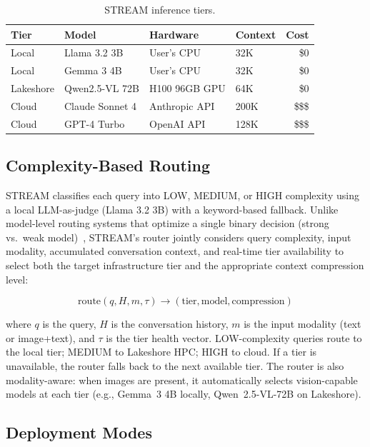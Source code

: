 \documentclass[manuscript, review]{acmart}
\begin{document}
\begin{table}[h]
\centering
\caption{STREAM inference tiers.}
\label{tab:tiers}
\small
\begin{tabular}{@{}llllr@{}}
\toprule
\textbf{Tier} & \textbf{Model} & \textbf{Hardware} & \textbf{Context} & \textbf{Cost} \\
\midrule
Local     & Llama 3.2 3B    & User's CPU     & 32K  & \$0 \\
Local     & Gemma 3 4B      & User's CPU     & 32K  & \$0 \\
Lakeshore & Qwen2.5-VL 72B  & H100 96GB GPU  & 64K  & \$0 \\
Cloud     & Claude Sonnet 4 & Anthropic API  & 200K & \$\$\$ \\
Cloud     & GPT-4 Turbo     & OpenAI API     & 128K & \$\$\$ \\
\bottomrule
\end{tabular}
\end{table}

\subsection{Complexity-Based Routing}

STREAM classifies each query into LOW, MEDIUM, or HIGH complexity using a local LLM-as-judge (Llama 3.2 3B) with a keyword-based fallback. Unlike model-level routing systems that optimize a single binary decision (strong vs.\ weak model)~\cite{routellm2024,hybridllm2024}, STREAM's router jointly considers query complexity, input modality, accumulated conversation context, and real-time tier availability to select both the target infrastructure tier and the appropriate context compression level:

\[
\text{route}(q, H, m, \tau) \rightarrow (\text{tier}, \text{model}, \text{compression})
\]

\noindent where $q$ is the query, $H$ is the conversation history, $m$ is the input modality (text or image+text), and $\tau$ is the tier health vector. LOW-complexity queries route to the local tier; MEDIUM to Lakeshore HPC; HIGH to cloud. If a tier is unavailable, the router falls back to the next available tier. The router is also modality-aware: when images are present, it automatically selects vision-capable models at each tier (e.g., Gemma~3 4B locally, Qwen~2.5-VL-72B on Lakeshore).

\subsection{Deployment Modes}
\end{document}
